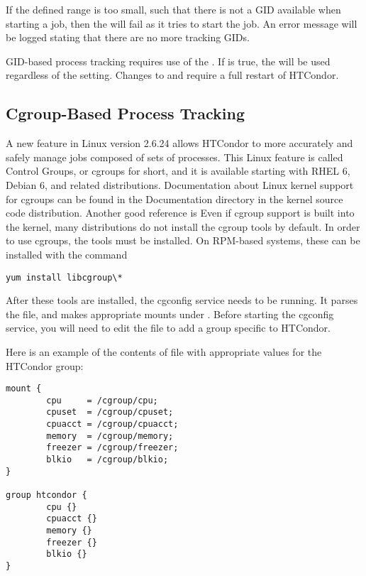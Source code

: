 If the defined range is too small, such that there is not a GID available
when starting a job,
then the  will fail as it tries to start the job.
An error message will be logged stating that there are no more tracking GIDs.

GID-based process tracking requires use of the . If
 is true, the  will
be used regardless of the  setting.  Changes to
 and  require
a full restart of HTCondor.

\subsection{\label{sec:CGroupTracking}Cgroup-Based Process Tracking} 

A new feature in Linux version 2.6.24 allows HTCondor to more accurately 
and safely manage jobs composed of sets of processes.  This Linux 
feature is called Control Groups, or cgroups for short, and it is 
available starting with RHEL 6, Debian 6, and related distributions.  
Documentation about Linux kernel support for cgroups can be found 
in the Documentation directory in the kernel source code distribution.
Another good reference is 
Even if cgroup support is built into the kernel, 
many distributions do not install the cgroup tools by default.
In order to use cgroups, the tools must be installed.  
On RPM-based systems, these can be installed with the command

\begin{verbatim}
yum install libcgroup\*
\end{verbatim}

After these tools are installed, the cgconfig service needs to be
running.  It parses the  file, and makes
appropriate mounts under .  Before starting the cgconfig
service, you will need to edit the file  to
add a group specific to HTCondor.

Here is an example of the contents of file  with
appropriate values for the HTCondor group:

\begin{verbatim}
mount {
        cpu		= /cgroup/cpu;
        cpuset	= /cgroup/cpuset;
        cpuacct = /cgroup/cpuacct;
        memory  = /cgroup/memory;
        freezer = /cgroup/freezer;
        blkio   = /cgroup/blkio;
}

group htcondor {
		cpu {}
        cpuacct {}
        memory {}
        freezer {}
        blkio {}
}
\end{verbatim}

